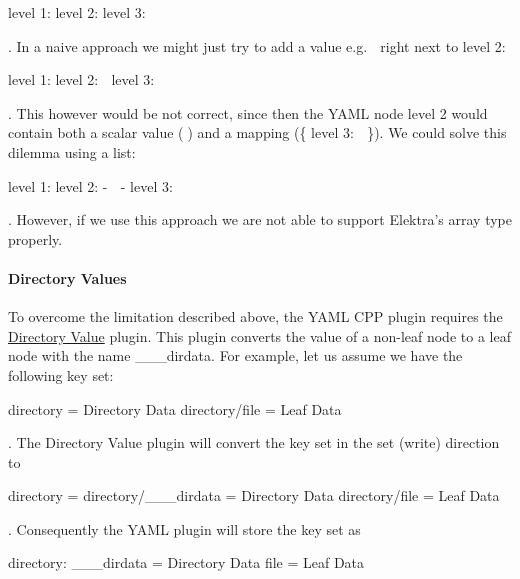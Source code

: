 \begin{DoxyCode}
level 1:
  level 2:
    level 3:  🍁
\end{DoxyCode}


. In a naive approach we might just try to add a value e.\+g. {\ttfamily 🙈} right next to level 2\+:


\begin{DoxyCode}
level 1:
  level 2: 🙈
    level 3:  🍁
\end{DoxyCode}


. This however would be not correct, since then the Y\+A\+ML node {\ttfamily level 2} would contain both a scalar value ({\ttfamily 🙈}) and a mapping ({\ttfamily \{ level 3\+: 🍁 \}}). We could solve this dilemma using a list\+:


\begin{DoxyCode}
level 1:
  level 2:
    - 🙈
    - level 3:  🍁
\end{DoxyCode}


. However, if we use this approach we are not able to support Elektra’s array type properly.

\paragraph*{Directory Values}

To overcome the limitation described above, the Y\+A\+ML C\+PP plugin requires the \hyperlink{md_src_plugins_directoryvalue_README_src_plugins_directoryvalue_README_md}{Directory Value} plugin. This plugin converts the value of a non-\/leaf node to a leaf node with the name {\ttfamily \+\_\+\+\_\+\+\_\+dirdata}. For example, let us assume we have the following key set\+:


\begin{DoxyCode}
directory      = Directory Data
directory/file = Leaf Data
\end{DoxyCode}


. The Directory Value plugin will convert the key set in the set (write) direction to


\begin{DoxyCode}
directory            =
directory/\_\_\_dirdata = Directory Data
directory/file       = Leaf Data
\end{DoxyCode}


. Consequently the Y\+A\+ML plugin will store the key set as


\begin{DoxyCode}
directory:
  \_\_\_dirdata = Directory Data
  file       = Leaf Data
\end{DoxyCode}


